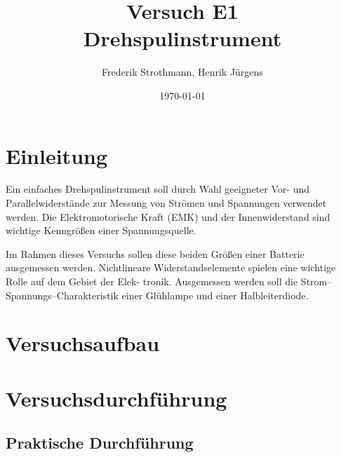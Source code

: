 \documentclass[12pt]{scrartcl}
\title{Versuch E1\\ Drehspulinstrument}
\author{Frederik Strothmann, Henrik Jürgens}
\date{\today}
\begin{document}

\maketitle
\tableofcontents
\newpage



\section{Einleitung}

Ein einfaches Drehspulinstrument soll durch Wahl geeigneter Vor- und Parallelwiderstände
zur Messung von Strömen und Spannungen verwendet werden.
Die Elektromotorische Kraft (EMK) und der Innenwiderstand sind wichtige Kenngrößen einer Spannungsquelle.

Im Rahmen dieses Versuchs sollen diese beiden Größen einer Batterie ausgemessen werden.
Nichtlineare Widerstandselemente spielen eine wichtige Rolle auf dem Gebiet der Elek-
tronik. Ausgemessen werden soll die Strom–Spannungs–Charakteristik einer Glühlampe
und einer Halbleiterdiode.

\section{Versuchsaufbau}


\section{Versuchsdurchführung}


\subsection{Praktische Durchführung}
\end{document}
